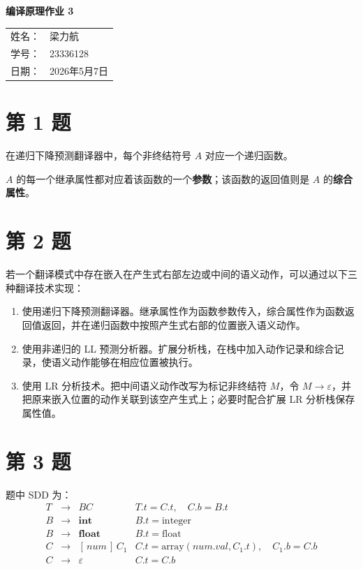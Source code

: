 \documentclass[12pt]{article}
\begin{document}
\begin{center}
    {\LARGE\bfseries 编译原理作业 3\par}
    \vspace{1.0cm}
    {\large
    \begin{tabular}{rl}
    姓名：& 梁力航 \\
    学号：& 23336128 \\
    日期：& 2026年5月7日
    \end{tabular}\par}
\end{center}

\vspace{0.8cm}

\section*{第 1 题}

在递归下降预测翻译器中，每个非终结符号 $A$ 对应一个递归函数。

$A$ 的每一个继承属性都对应着该函数的一个\textbf{参数}；该函数的返回值则是 $A$ 的\textbf{综合属性}。

\section*{第 2 题}

若一个翻译模式中存在嵌入在产生式右部左边或中间的语义动作，可以通过以下三种翻译技术实现：

\begin{enumerate}
    \item 使用递归下降预测翻译器。继承属性作为函数参数传入，综合属性作为函数返回值返回，并在递归函数中按照产生式右部的位置嵌入语义动作。
    \item 使用非递归的 LL 预测分析器。扩展分析栈，在栈中加入动作记录和综合记录，使语义动作能够在相应位置被执行。
    \item 使用 LR 分析技术。把中间语义动作改写为标记非终结符 $M$，令 $M \to \varepsilon$，并把原来嵌入位置的动作关联到该空产生式上；必要时配合扩展 LR 分析栈保存属性值。
\end{enumerate}

\section*{第 3 题}

题中 SDD 为：
\[
\begin{array}{rcll}
T &\to& B C
& T.t=C.t,\quad C.b=B.t \\
B &\to& \mathbf{int}
& B.t=\mathrm{integer} \\
B &\to& \mathbf{float}
& B.t=\mathrm{float} \\
C &\to& [\,num\,]\,C_1
& C.t=\mathrm{array}(num.val,C_1.t),\quad C_1.b=C.b \\
C &\to& \varepsilon
& C.t=C.b
\end{array}
\]
\end{document}
